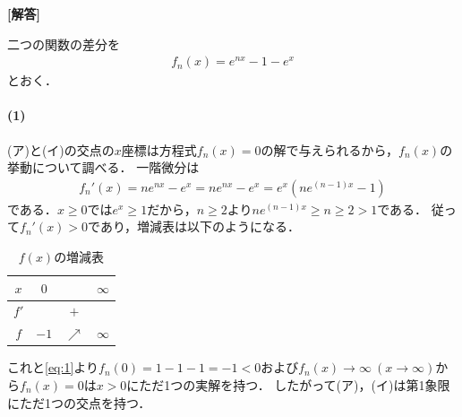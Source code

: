 \documentclass[../../main.tex]{subfiles}
\begin{document}
\begin{oframed}
  
\end{oframed}

{\bf [解答]}

二つの関数の差分を
\begin{align}
  f_n(x)=e^{nx}-1-e^x \label{eq:1}
\end{align}
とおく．

\paragraph{(1)}

(ア)と(イ)の交点の$x$座標は方程式$f_n(x)=0$の解で与えられるから，$f_n(x)$の挙動について調べる．
一階微分は
\begin{align}
  f_n'(x)=ne^{nx}-e^x=ne^{nx}-e^{x}=e^{x}(ne^{(n-1)x}-1)
\end{align}
である．$x \ge 0$では$e^x\ge1$だから，$n\ge2$より$ne^{(n-1)x}\ge n\ge2>1$である．
従って$f_n'(x)>0$であり，増減表は以下のようになる．

\begin{table}[htb]
  \centering
  \caption{$f(x)$の増減表}
  \begin{tabular}{c|ccc}
    $x$ & $0$ & & $\infty$\\
    \hline
    $f'$ & & $+$ & \\
    \hline
    $f$ & $-1$ & $\nearrow$ &$\infty$
  \end{tabular}
\end{table}

これと\cref{eq:1}より$f_n(0)=1-1-1=-1<0$および$f_n(x)\to\infty\ (x\to\infty)$から$f_n(x)=0$は$x>0$にただ1つの実解を持つ．
したがって(ア)，(イ)は第1象限にただ1つの交点を持つ．
\end{document}
